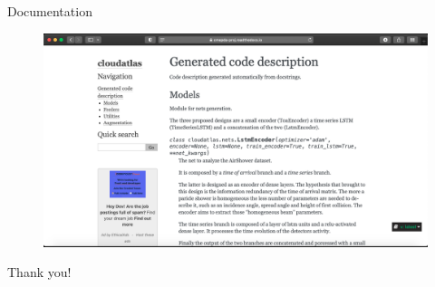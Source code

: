 \documentclass{beamer}
\begin{document}
\begin{frame}{Documentation}
    \begin{figure}
        \centering
        \includegraphics[width=\textwidth]{figures/docs.png}
    \end{figure}
    
    \end{frame}
    

\begin{frame}
\centering
\vfill
Thank you!
\vfill
    
\end{frame}
\end{document}
